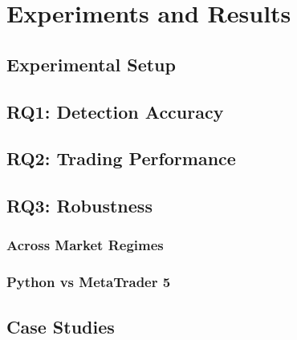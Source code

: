 \chapter{Experiments and Results}
\label{ch:results}

\section{Experimental Setup}

\section{RQ1: Detection Accuracy}

\section{RQ2: Trading Performance}

\section{RQ3: Robustness}
\subsection{Across Market Regimes}
\subsection{Python vs MetaTrader 5}

\section{Case Studies}
